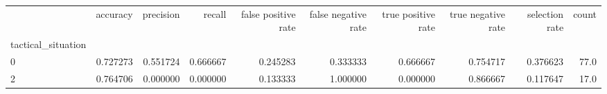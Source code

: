 \begin{tabular}{lrrrrrrrrr}
\toprule
{} &  accuracy &  precision &    recall &  false positive rate &  false negative rate &  true positive rate &  true negative rate &  selection rate &  count \\
tactical\_situation &           &            &           &                      &                      &                     &                     &                 &        \\
\midrule
0                  &  0.727273 &   0.551724 &  0.666667 &             0.245283 &             0.333333 &            0.666667 &            0.754717 &        0.376623 &   77.0 \\
2                  &  0.764706 &   0.000000 &  0.000000 &             0.133333 &             1.000000 &            0.000000 &            0.866667 &        0.117647 &   17.0 \\
\bottomrule
\end{tabular}
